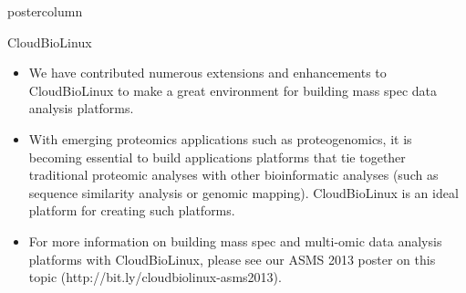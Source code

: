 \documentclass[final]{beamer}
\begin{document}
\begin{frame}
\begin{columns}
\begin{column}{.49\textwidth}
\begin{beamercolorbox}[center,wd=\textwidth]{postercolumn}
\begin{minipage}[T]{.99\textwidth}
{\begin{block}{CloudBioLinux}
\begin{itemize}
                \item We have contributed numerous extensions and enhancements to
                CloudBioLinux to make a great environment for building mass spec data analysis
                platforms.

                \item With emerging proteomics applications such as
                proteogenomics, it is becoming essential to build applications
                platforms that tie together traditional proteomic analyses
                with other bioinformatic analyses (such as sequence similarity 
                analysis or genomic mapping). CloudBioLinux is an ideal platform 
                for creating such platforms.

                \item For more information on building mass spec and multi-omic data analysis platforms with CloudBioLinux,
                please see our ASMS 2013 poster on this topic (http://bit.ly/cloudbiolinux-asms2013).
              \end{itemize}
            \end{block}
            \vfill
          }
        \end{minipage}
      \end{beamercolorbox}
    \end{column}
  \end{columns}
\end{frame}
\end{document}
